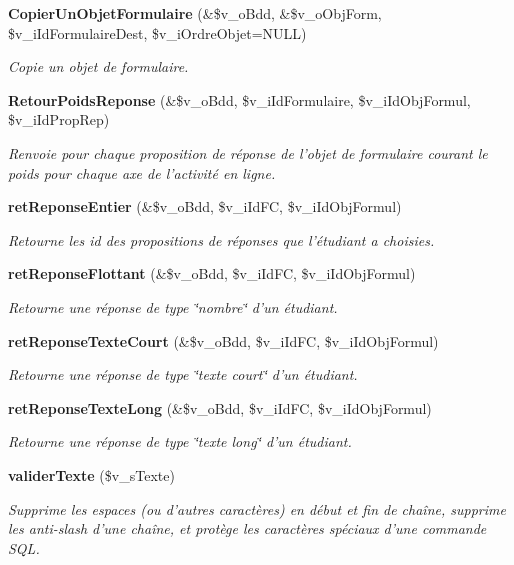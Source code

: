 \begin{CompactItemize}
{\bf CopierUnObjetFormulaire} (\&\$v\_\-oBdd, \&\$v\_\-oObjForm, \$v\_\-iIdFormulaireDest, \$v\_\-iOrdreObjet=NULL)
\begin{CompactList}\small\item\em Copie un objet de formulaire. \item\end{CompactList}\item 
{\bf RetourPoidsReponse} (\&\$v\_\-oBdd, \$v\_\-iIdFormulaire, \$v\_\-iIdObjFormul, \$v\_\-iIdPropRep)
\begin{CompactList}\small\item\em Renvoie pour chaque proposition de réponse de l'objet de formulaire courant le poids pour chaque axe de l'activité en ligne. \item\end{CompactList}\item 
{\bf retReponseEntier} (\&\$v\_\-oBdd, \$v\_\-iIdFC, \$v\_\-iIdObjFormul)
\begin{CompactList}\small\item\em Retourne les id des propositions de réponses que l'étudiant a choisies. \item\end{CompactList}\item 
{\bf retReponseFlottant} (\&\$v\_\-oBdd, \$v\_\-iIdFC, \$v\_\-iIdObjFormul)
\begin{CompactList}\small\item\em Retourne une réponse de type \char`\"{}nombre\char`\"{} d'un étudiant. \item\end{CompactList}\item 
{\bf retReponseTexteCourt} (\&\$v\_\-oBdd, \$v\_\-iIdFC, \$v\_\-iIdObjFormul)
\begin{CompactList}\small\item\em Retourne une réponse de type \char`\"{}texte court\char`\"{} d'un étudiant. \item\end{CompactList}\item 
{\bf retReponseTexteLong} (\&\$v\_\-oBdd, \$v\_\-iIdFC, \$v\_\-iIdObjFormul)
\begin{CompactList}\small\item\em Retourne une réponse de type \char`\"{}texte long\char`\"{} d'un étudiant. \item\end{CompactList}\item 
{\bf validerTexte} (\$v\_\-sTexte)
\begin{CompactList}\small\item\em Supprime les espaces (ou d'autres caractères) en début et fin de chaîne, supprime les anti-slash d'une chaîne, et protège les caractères spéciaux d'une commande SQL. \item\end{CompactList}\end{CompactItemize}


